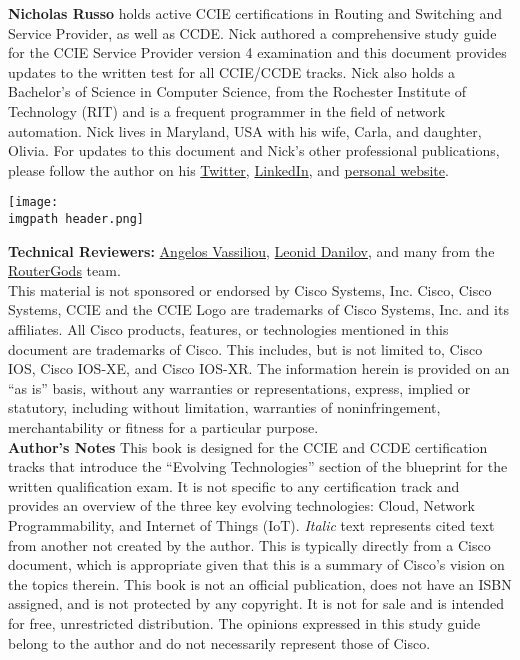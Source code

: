\noindent
\textbf{Nicholas Russo} holds active CCIE certifications in Routing and
Switching and Service Provider, as well as CCDE\@. Nick authored a comprehensive
study guide for the CCIE Service Provider version 4 examination and this
document provides updates to the written test for all CCIE/CCDE tracks. Nick
also holds a Bachelor’s of Science in Computer Science, from the Rochester
Institute of Technology (RIT) and is a frequent programmer in the field of
network automation. Nick lives in Maryland, USA with his wife, Carla, and
daughter, Olivia. For updates to this document and Nick’s other professional
publications, please follow the author on his
\href{https://twitter.com/nickrusso42518}{Twitter},
\href{https://www.linkedin.com/in/njrusmc}{LinkedIn}, and
\href{http://njrusmc.net}{personal website}. \\

    \begin{minipage}[t]{\linewidth}
	  \centering
      \texttt{[image: \\imgpath header.png]}
    \end{minipage}

\textbf{Technical Reviewers:}
\href{https://twitter.com/ipmess}{Angelos Vassiliou},
\href{https://twitter.com/iosxrqna}{Leonid Danilov}, and many from the
\href{https://www.meetup.com/routergods}{RouterGods} team. \\

This material is not sponsored or endorsed by Cisco Systems, Inc. Cisco, Cisco
Systems, CCIE and the CCIE Logo are trademarks of Cisco Systems, Inc. and its
affiliates. All Cisco products, features, or technologies mentioned in this
document are trademarks of Cisco. This includes, but is not limited to, Cisco
IOS, Cisco IOS-XE, and Cisco IOS-XR\@. The information herein is provided on an
``as is'' basis, without any warranties or representations, express, implied or
statutory, including without limitation, warranties of noninfringement,
merchantability or fitness for a particular purpose. \\

\textbf{Author’s Notes}
This book is designed for the CCIE and CCDE certification tracks that
introduce the ``Evolving Technologies'' section of the blueprint for the written
qualification exam. It is not specific to any certification track and provides
an overview of the three key evolving technologies: Cloud, Network
Programmability, and Internet of Things (IoT). \textit{Italic} text represents
cited text from another not created by the author. This is typically directly
from a Cisco document, which is appropriate given that this is a summary of
Cisco’s vision on the topics therein. This book is not an official
publication, does not have an ISBN assigned, and is not protected by any
copyright. It is not for sale and is intended for free, unrestricted
distribution. The opinions expressed in this study guide belong to the author
and do not necessarily represent those of Cisco. \\

